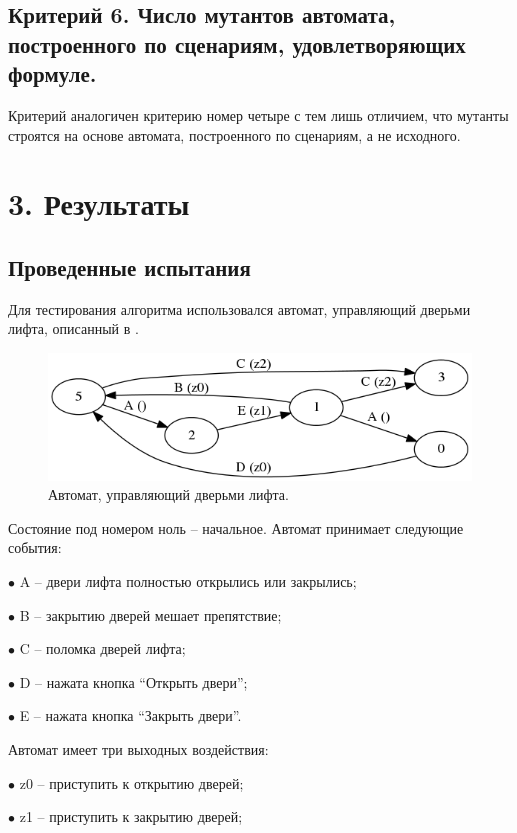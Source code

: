 \documentclass[12pt,fleqn]{article}
\begin{document}
\subsection*{Критерий 6. Число мутантов автомата, построенного по сценариям, удовлетворяющих формуле.}

Критерий аналогичен критерию номер четыре с тем лишь отличием, что мутанты строятся на основе автомата, построенного по
сценариям, а не исходного.

\section*{3. Результаты}

\subsection*{Проведенные испытания}

Для тестирования алгоритма использовался автомат, управляющий дверьми лифта, описанный в \cite[Sec 2.3.1]{eg}.

\begin{figure}[!hb]
  \centering
    \includegraphics[scale=0.5]{lift.png}
  \caption{Автомат, управляющий дверьми лифта.}
\end{figure}

Состояние под номером ноль -- начальное. Автомат принимает следующие события:

$\bullet$ A -- двери лифта полностью открылись или закрылись;

$\bullet$ B -- закрытию дверей мешает препятствие;

$\bullet$ C -- поломка дверей лифта;

$\bullet$ D -- нажата кнопка ``Открыть двери'';

$\bullet$ E -- нажата кнопка ``Закрыть двери''.

Автомат имеет три выходных воздействия:

$\bullet$ z0 -- приступить к открытию дверей;

$\bullet$ z1 -- приступить к закрытию дверей;
\end{document}
